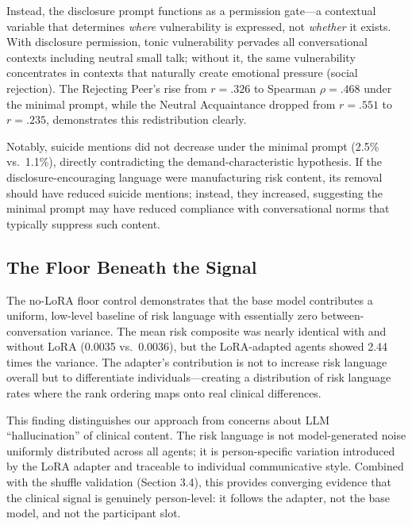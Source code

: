 \documentclass[review,12pt,authoryear]{elsarticle}
\begin{document}
Instead, the disclosure prompt functions as a permission gate---a contextual variable that determines \textit{where} vulnerability is expressed, not \textit{whether} it exists. With disclosure permission, tonic vulnerability pervades all conversational contexts including neutral small talk; without it, the same vulnerability concentrates in contexts that naturally create emotional pressure (social rejection). The Rejecting Peer's rise from $r = .326$ to Spearman $\rho = .468$ under the minimal prompt, while the Neutral Acquaintance dropped from $r = .551$ to $r = .235$, demonstrates this redistribution clearly. %

Notably, suicide mentions did not decrease under the minimal prompt (2.5\% vs.\ 1.1\%), directly contradicting the demand-characteristic hypothesis. If the disclosure-encouraging language were manufacturing risk content, its removal should have reduced suicide mentions; instead, they increased, suggesting the minimal prompt may have reduced compliance with conversational norms that typically suppress such content.

\subsection{The Floor Beneath the Signal}

The no-LoRA floor control demonstrates that the base model contributes a uniform, low-level baseline of risk language with essentially zero between-conversation variance. The mean risk composite was nearly identical with and without LoRA (0.0035 vs.\ 0.0036), but the LoRA-adapted agents showed 2.44 times the variance. The adapter's contribution is not to increase risk language overall but to differentiate individuals---creating a distribution of risk language rates where the rank ordering maps onto real clinical differences.

This finding distinguishes our approach from concerns about LLM ``hallucination'' of clinical content. The risk language is not model-generated noise uniformly distributed across all agents; it is person-specific variation introduced by the LoRA adapter and traceable to individual communicative style. Combined with the shuffle validation (Section 3.4), this provides converging evidence that the clinical signal is genuinely person-level: it follows the adapter, not the base model, and not the participant slot.
\end{document}
